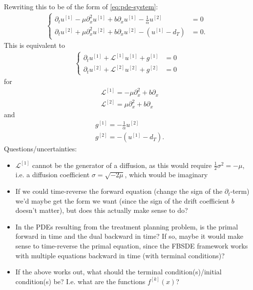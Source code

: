 \documentclass{article}  %
\begin{document}
Rewriting this to be of the form of \autoref{eq:pde-system}:
%
\begin{align}
    \begin{cases}
    \partial_t u^{[1]} - \mu \partial^2_x u^{[1]} + b \partial_x u^{[1]} - \frac{1}{\alpha} u^{[2]} &= 0 \\
    \partial_t u^{[2]} + \mu \partial_x^2 u^{[2]} + b \partial_x u^{[2]} - (u^{[1]} - d_T) &= 0.
    \end{cases}
\end{align}
%
This is equivalent to 
%
\begin{align} 
    \begin{cases}
    \partial_t u^{[1]} + \mathcal{L}^{[1]} u^{[1]} + g^{[1]} &= 0\\
    \partial_t u^{[2]} + \mathcal{L}^{[2]} u^{[2]} + g^{[2]} &= 0
    \end{cases}
\end{align}
%
for 
%
\begin{align} 
    &\mathcal{L}^{[1]} = - \mu \partial_x^2 + b \partial_x\\
    &\mathcal{L}^{[2]} = \mu \partial_x^2 + b \partial_x
\end{align}
%
and 
%
\begin{align} 
    &g^{[1]} = -\frac{1}{\alpha} u^{[2]}\\
    &g^{[2]} = -(u^{[1]}-d_T).
\end{align}
%
Questions/uncertainties:
\begin{itemize}
    \item $\mathcal{L}^{[1]}$ cannot be the generator of a diffusion, as this would require $\frac{1}{2}\sigma^2 = -\mu$, i.e. a diffusion coefficient $\sigma = \sqrt{-2\mu}$, which would be imaginary
    \item If we could time-reverse the forward equation (change the sign of the $\partial_t$-term) we'd maybe get the form we want (since the sign of the drift coefficient $b$ doesn't matter), but does this actually make sense to do?
    \item In the PDEs resulting from the treatment planning problem, is the primal forward in time and the dual backward in time? If so, maybe it would make sense to time-reverse the primal equation, since the FBSDE framework works with multiple equations backward in time (with terminal conditions)?
    \item If the above works out, what should the terminal condition(s)/initial condition(s) be? I.e. what are the functions $f^{[k]}(x)$?
\end{itemize}
\end{document}
